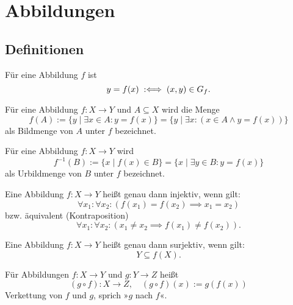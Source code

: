 \newpage
\section{Abbildungen}
\subsection{Definitionen}

\begin{Definition}\label{def:app}
Für eine Abbildung $f$ ist
\[y=f(x)\;:\Longleftrightarrow\; (x,y)\in G_f.\]
\end{Definition}

\begin{Definition}%
\label{def:img}\newlinefirst
Für eine Abbildung $f\colon X\to Y$ und $A\subseteq X$
wird die Menge
\[f(A) := \{y\mid \exists x\in A\colon y=f(x)\}
= \{y\mid \exists x\colon (x\in A\land y=f(x))\}\]
als Bildmenge von $A$ unter $f$ bezeichnet.
\end{Definition}

\begin{Definition}\label{def:preimg}
Für eine Abbildung $f\colon X\to Y$ wird
\[f^{-1}(B) := \{x\mid f(x)\in B\} = \{x\mid \exists y\in B\colon y=f(x)\}\]
als Urbildmenge von $B$ unter $f$ bezeichnet.
\end{Definition}

\begin{Definition}%
\label{def:inj}\newlinefirst
Eine Abbildung $f\colon X\to Y$ heißt genau dann injektiv, wenn gilt:%
\[\forall x_1\colon \forall x_2\colon (f(x_1)=f(x_2)\implies x_1=x_2)\]
bzw. äquivalent (Kontraposition)
\[\forall x_1\colon \forall x_2\colon (x_1\ne x_2\implies f(x_1)\ne f(x_2)).\]
\end{Definition}

\begin{Definition}%
\label{def:sur}\newlinefirst
Eine Abbildung $f\colon X\to Y$ heißt genau dann surjektiv, wenn gilt:%
\[Y\subseteq f(X).\]
\end{Definition}

\begin{Definition}\label{def:composition}%
\newlinefirst
Für Abbildungen $f\colon X\to Y$ und $g\colon Y\to Z$ heißt%
\[(g\circ f)\colon X\to Z,\quad (g\circ f)(x):=g(f(x))\]
Verkettung von $f$ und $g$, sprich »$g$ nach $f$«.
\end{Definition}

